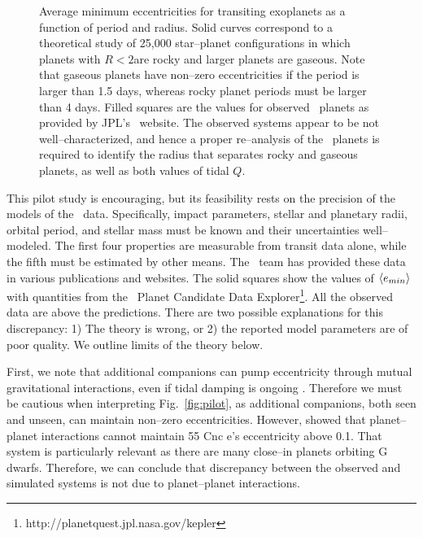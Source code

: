 \begin{figure}[h]
\centering
\begin{minipage}{2.7in}
\end{minipage}
\begin{minipage}{2.7in}
\caption{\label{fig:emin}Average minimum eccentricities for transiting
  exoplanets as a function of period and radius.  Solid curves
  correspond to a theoretical study of 25,000 star--planet
  configurations in which planets with $R < 2$\rearth are rocky and
  larger planets are gaseous.  Note that gaseous planets have
  non--zero eccentricities if the period is larger than 1.5 days,
  whereas rocky planet periods must be larger than 4 days.  Filled
  squares are the values for observed \kepler~planets as provided by
  JPL's \kepler~website.  The observed systems appear to be not
  well--characterized, and hence a proper re--analysis of the
  \kepler~planets is required to identify the radius that separates
  rocky and gaseous planets, as well as both values of tidal $Q$.}
\end{minipage}
\end{figure}

This pilot study is encouraging, but its feasibility rests on the
precision of the models of the \kepler~data.  Specifically, impact
parameters, stellar and planetary radii, orbital period, and stellar
mass must be known and their uncertainties well--modeled.  The first
four properties are measurable from transit data alone, while the
fifth must be estimated by other means.  The \kepler~team has provided
these data in various publications and websites.  The solid squares
show the values of $\left< e_{min} \right>$ with quantities from the
\kepler~Planet Candidate Data
Explorer\footnote{http://planetquest.jpl.nasa.gov/kepler}.  All the
observed data are above the predictions. There are two possible
explanations for this discrepancy: 1) The theory is wrong, or 2) the
reported model parameters are of poor quality.  We outline limits of
the theory below.

\medskip
{\centerline{}}
\smallskip

First, we note that additional companions can pump eccentricity
through mutual gravitational interactions, even if tidal damping is
ongoing \citep{vanLaerhovenGreenberg13,Bolmont13}.  Therefore we must
be cautious when interpreting Fig.~\ref{fig:pilot}, as additional
companions, both seen and unseen, can maintain non--zero
eccentricities.  However, \cite{Bolmont13} showed that planet--planet
interactions cannot maintain 55 Cnc e's eccentricity above 0.1.  That
system is particularly relevant as there are many close--in planets
orbiting G dwarfs.  Therefore, we can conclude that discrepancy
between the observed and simulated systems is not due to
planet--planet interactions.

